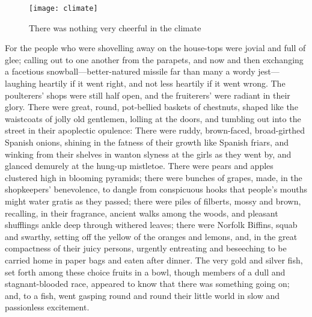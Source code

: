 \begin{figure}[p]
\begin{minipage}[c]{\textwidth}
\texttt{[image: climate]}
\caption{There was nothing very cheerful in the climate}
\end{minipage}
\end{figure}



For the people who were shovelling away on the house-tops were jovial and full of glee; calling out to one another from the parapets, and now and then exchanging a facetious snowball—better-natured missile far than many a wordy jest—laughing heartily if it went right, and not less heartily if it went wrong. The poulterers' shops were still half open, and the fruiterers' were radiant in their glory. There were great, round, pot-bellied baskets of chestnuts, shaped like the waistcoats of jolly old gentlemen, lolling at the doors, and tumbling out into the street in their apoplectic opulence: There were ruddy, brown-faced, broad-girthed Spanish onions, shining in the fatness of their growth like Spanish friars, and winking from their shelves in wanton slyness at the girls as they went by, and glanced demurely at the hung-up mistletoe. There were pears and apples clustered high in blooming pyramids; there were bunches of grapes, made, in the shopkeepers' benevolence, to dangle from conspicuous hooks that people's  mouths might water gratis as they passed; there were piles of filberts, mossy and brown, recalling, in their fragrance, ancient walks among the woods, and pleasant shufflings ankle deep through withered leaves; there were Norfolk Biffins, squab and swarthy, setting off the yellow of the oranges and lemons, and, in the great compactness of their juicy persons, urgently entreating and beseeching to be carried home in paper bags and eaten after dinner. The very gold and silver fish, set forth among these choice fruits in a bowl, though members of a dull and stagnant-blooded race, appeared to know that there was something going on; and, to a fish, went gasping round and round their little world in slow and passionless excitement.

